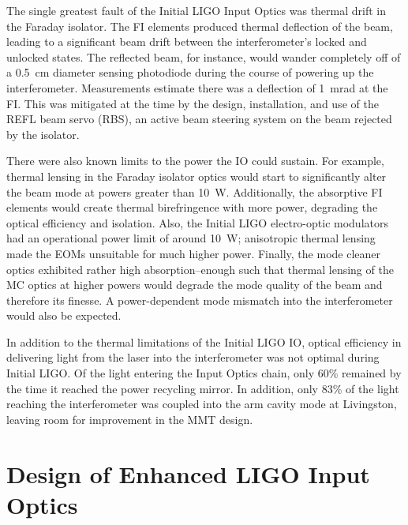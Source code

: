 The single greatest fault of the Initial LIGO Input Optics was thermal drift in the Faraday isolator. The FI elements produced thermal deflection of the beam, leading to a significant beam drift between the interferometer's locked and unlocked states. The reflected beam, for instance, would wander completely off of a 0.5~cm diameter sensing photodiode during the course of powering up the interferometer. Measurements estimate there was a deflection of 1~mrad at the FI. This was mitigated at the time by the design, installation, and use of the REFL beam servo (RBS), an active beam steering system on the beam rejected by the isolator.

There were also known limits to the power the IO could sustain. For
example, thermal lensing in the Faraday isolator optics would start to
significantly alter the beam mode at powers greater than
10~W. Additionally, the absorptive FI elements would create thermal
birefringence with more power, degrading the optical efficiency and
isolation. Also, the Initial LIGO electro-optic modulators had an
operational power limit of around 10~W; anisotropic thermal lensing
made the EOMs unsuitable for much higher power. Finally, the mode
cleaner optics exhibited rather high absorption--enough such that
thermal lensing of the MC optics at higher powers would degrade the
mode quality of the beam and therefore its finesse. A power-dependent
mode mismatch into the interferometer would also be expected.

In addition to the thermal limitations of the Initial LIGO IO, optical
efficiency in delivering light from the laser into the interferometer
was not optimal during Initial LIGO. Of the light entering the Input
Optics chain, only 60\% remained by the time it reached the power
recycling mirror. In addition, only 83\% of the light reaching the
interferometer was coupled into the arm cavity mode at Livingston,
leaving room for improvement in the MMT design.



\section{Design of Enhanced LIGO Input Optics}

